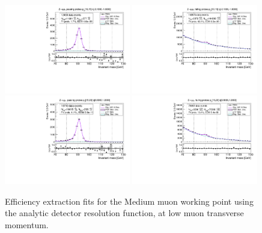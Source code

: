 \begin{figure}
\centering
\includegraphics[width=0.49\textwidth]{figures/Zmm_ResFunc_BkgLPi_pass_ptBin0_etaBin1.pdf}
\includegraphics[width=0.49\textwidth]{figures/Zmm_ResFunc_BkgLPi_fail_ptBin0_etaBin1.pdf}
\includegraphics[width=0.49\textwidth]{figures/Zmm_ResFunc_BkgLPi_pass_ptBin1_etaBin9.pdf}
\includegraphics[width=0.49\textwidth]{figures/Zmm_ResFunc_BkgLPi_fail_ptBin1_etaBin9.pdf}
\caption{Efficiency extraction fits for the Medium muon working point using the analytic detector resolution function, at low muon transverse momentum.}
\label{fig:ZmmAltSigResFits1}
\end{figure}

